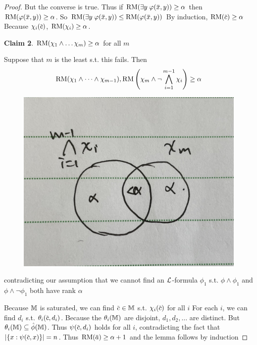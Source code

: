 \documentclass[11pt]{article}
\begin{document}
\begin{proof}
{But the converse is true. Thus if \(\RM(\exists y\;\varphi(\barx,y))\ge\alpha\) then \(\RM(\varphi(\barx,y))\ge\alpha\).
So \(\RM(\exists y\;\varphi(\barx,y))\le\RM(\varphi(\barx,y))\)
}
By induction, \(\RM(\barc)\ge\alpha\)
Because \(\chi_i(\barc)\), \(\operatorname{RM}(\chi_i)\ge\alpha\).

\textbf{Claim 2}. \(\operatorname{RM}(\chi_1\wedge\dots\chi_m)\ge\alpha\) for all \(m\)

Suppose that \(m\) is the least s.t. this fails. Then
\begin{equation*}
\operatorname{RM}(\chi_1\wedge\dots\wedge\chi_{m-1}),\operatorname{RM}\left( \chi_m\wedge\neg\bigwedge_{i=1}^{m-1}\chi_i \right)\ge\alpha
\end{equation*}
\begin{figure}[htbp]
\centering
\includegraphics[width=.5\textwidth]{../images/ModelTheoryAnIntroduction/1.jpg}
\label{Illustration}
\end{figure}
contradicting our assumption that we cannot find an \(\mathcal{L}\)-formula \(\phi_1\) s.t. \(\phi\wedge\phi_1\)
and \(\phi\wedge\neg\phi_1\) both have rank \(\alpha\)

Because  \(\mathbb{M}\) is saturated, we can find \(\barc\in\M\) s.t. \(\chi_i(\barc)\) for all \(i\)
For each \(i\), we can find \(d_i\) s.t. \(\theta_i(\barc,d_i)\). Because the \(\theta_i(\mathbb{M})\) are
disjoint, \(d_1,d_2,\dots\) are distinct. But \(\theta_i(\mathbb{M})\subseteq\hat{\phi}(\mathbb{M})\). Thus \(\psi(\barc,d_i)\) holds for
all \(i\), contradicting the fact that \(\abs{\{x:\psi(\barc,x)\}}=n\). Thus \(\RM(\bara)\ge\alpha+1\) and
the lemma follows by induction
\end{proof}
\end{document}
